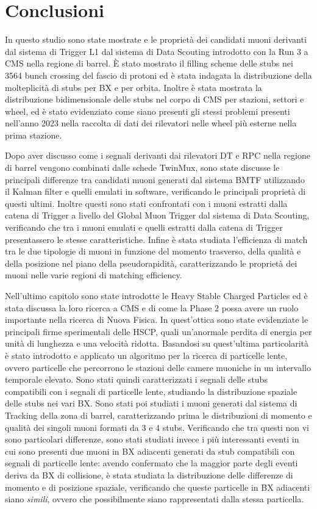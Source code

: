 \chapter{Conclusioni}
\label{cap:Conclusioni}

In questo studio sono state mostrate e le proprietà dei candidati muoni derivanti dal sistema di Trigger L1 dal sistema di Data Scouting introdotto con la Run 3 a CMS nella regione di barrel. È stato mostrato il filling scheme delle stubs nei 3564 bunch crossing del fascio di protoni ed è stata indagata la distribuzione della molteplicità di stubs per BX e per orbita. Inoltre è stata mostrata la distribuzione bidimensionale delle stubs nel corpo di CMS per stazioni, settori e wheel, ed è stato evidenziato come siano presenti gli stessi problemi presenti nell'anno 2023 nella raccolta di dati dei rilevatori nelle wheel più esterne nella prima stazione.

Dopo aver discusso come i segnali derivanti dai rilevatori DT e RPC nella regione di barrel vengono combinati dalle schede TwinMux, sono state discusse le principali differenze tra candidati muoni generati dal sistema BMTF utilizzando il Kalman filter e quelli emulati in software, verificando le principali proprietà di questi ultimi. Inoltre questi sono stati confrontati con i muoni estratti dalla catena di Trigger a livello del Global Muon Trigger dal sistema di Data Scouting, verificando che tra i muoni emulati e quelli estratti dalla catena di Trigger presentassero le stesse caratteristiche. Infine è stata studiata l'efficienza di match tra le due tipologie di muoni in funzione del momento trasverso, della qualità e della posizione nel piano della pseudorapidità, caratterizzando le proprietà dei muoni nelle varie regioni di matching efficiency. 


Nell'ultimo capitolo sono state introdotte le Heavy Stable Charged Particles ed è stata discussa la loro ricerca a CMS e di come la Phase 2 possa avere un ruolo importante nella ricerca di Nuova Fisica. In quest'ottica sono state evidenziate le principali firme sperimentali delle HSCP, quali un'anormale perdita di energia per unità di lunghezza e una velocità ridotta. Basandosi su quest'ultima particolarità è stato introdotto e applicato un algoritmo per la ricerca di particelle lente, ovvero particelle che percorrono le stazioni delle camere muoniche in un intervallo temporale elevato.\newline
Sono stati quindi caratterizzati i segnali delle stubs compatibili con i segnali di particelle lente, studiando la distribuzione spaziale delle stubs nei vari BX. Sono stati poi studiati i muoni generati dal sistema di Tracking della zona di barrel, caratterizzando prima le distribuzioni di momento e qualità dei singoli muoni formati da 3 e 4 stubs. Verificando che tra questi non vi sono particolari differenze, sono stati studiati invece i più interessanti eventi in cui sono presenti due muoni in BX adiacenti generati da stub compatibili con segnali di particelle lente: avendo confermato che la maggior parte degli eventi deriva da BX di collisione, è stata studiata la distribuzione delle differenze di momento e di posizione spaziale, verificando che queste particelle in BX adiacenti siano \textit{simili}, ovvero che possibilmente siano rappresentati dalla stessa particella.